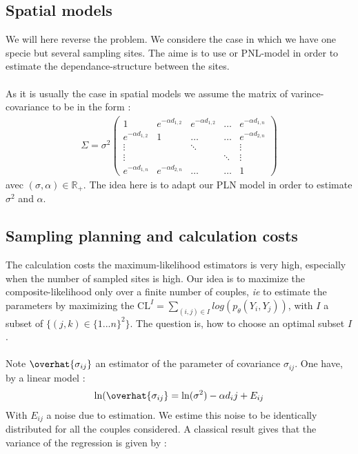 \documentclass[11pt, a4paper]{article}
\begin{document}
\subsection{Spatial models}
We will here reverse the problem. We considere the case in which we have one specie but several sampling sites. The aime is to use or PNL-model in order to estimate the dependance-structure between the sites. \\
\\
As it is usually the case in spatial models \cite{cressie2015statistics} we assume the matrix of varince-covariance to be in the form :
\begin{align*}
\Sigma = \sigma^2 \begin{pmatrix}
1 &  e^{-\alpha d_{1,2}} &  e^{-\alpha d_{1,2}} & \ldots &  e^{- \alpha d_{1,n}}  \\
 e^{-\alpha d_{1,2}} & 1 & \ldots & \ldots &  e^{- \alpha d_{2,n}}\\
 \vdots & & \ddots & & \vdots\\
 \vdots & & & \ddots & \vdots \\
 e^{-\alpha d_{1,n}} &  e^{-\alpha d_{2,n}} & \ldots & \ldots & 1 
\end{pmatrix}
\end{align*}
avec $ (\sigma, \alpha) \in \mathbb{R}_{+}$.
The idea here is to adapt our PLN model in order to estimate $\sigma^2$ and $\alpha$. 

\subsection{Sampling planning and calculation costs}

The calculation costs the maximum-likelihood estimators is very high, especially when the number of sampled sites is high. Our idea is to maximize the composite-likelihood only over a finite number of couples, \textit{ie} to estimate the parameters by maximizing the $\mathrm{CL}^{I} = \sum_{(i,j) \in I} log( p_{\theta}(Y_i,Y_j))$, with $I$ a subset of $\{(j,k) \in \{1...n\}^2\}$. The question is, how to choose an optimal subset $I$.\\
\\
Note $\overhat{\sigma_{ij}}$ an estimator of the parameter of covariance $\sigma_{ij}$.
One have, by a linear model :
\begin{align*}
\mathrm{ln}(\overhat{\sigma_{ij}} = \mathrm{ln} ( \sigma^2) - \alpha d_ij + E_{ij}
\end{align*}
With $E_{ij}$ a noise due to estimation. We estime this noise to be  identically distributed  for all the couples considered.
A classical result gives that the variance of the regression is given by : 
\end{document}
